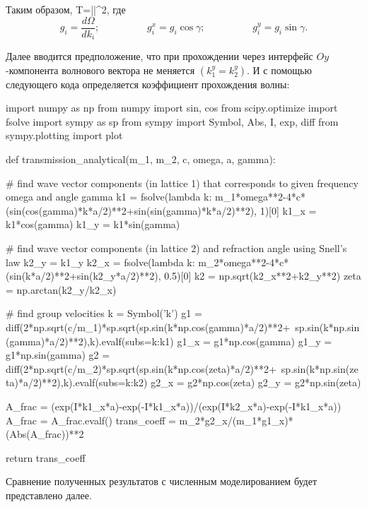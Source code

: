 \documentclass[main.tex]{subfiles}
\begin{document}
Таким образом,
\beq
T=\left|\right|^2,
\eeq
где
$$
g_i=\frac{d\Omega}{dk_i};\hspace{2cm}g_i^x=g_i\cos{\gamma};\hspace{2cm}g_i^y=g_i\sin{\gamma}.
$$

Далее вводится предположение, что при прохождении через интерфейс $Oy$-компонента волнового вектора не меняется $\left(k_1^y=k_2^y\right)$.
И с помощью следующего кода определяется коэффициент прохождения волны:

\begin{pythoncode}
import numpy as np
from numpy import sin, cos
from scipy.optimize import fsolve
import sympy as sp
from sympy import Symbol, Abs, I, exp, diff
from sympy.plotting import plot


def transmission_analytical(m_1, m_2, c, omega, a, gamma):

    # find wave vector components (in lattice 1) that corresponds to given frequency omega and angle gamma
    k1 = fsolve(lambda k: m_1*omega**2-4*c*(sin(cos(gamma)*k*a/2)**2+sin(sin(gamma)*k*a/2)**2), 1)[0]
    k1_x = k1*cos(gamma)
    k1_y = k1*sin(gamma)

    # find wave vector components (in lattice 2) and refraction angle using Snell's law
    k2_y = k1_y
    k2_x = fsolve(lambda k: m_2*omega**2-4*c*(sin(k*a/2)**2+sin(k2_y*a/2)**2), 0.5)[0]
    k2 = np.sqrt(k2_x**2+k2_y**2)
    zeta = np.arctan(k2_y/k2_x)

    # find group velocities
    k = Symbol('k')
    g1 = diff(2*np.sqrt(c/m_1)*sp.sqrt(sp.sin(k*np.cos(gamma)*a/2)**2+\
                                       sp.sin(k*np.sin(gamma)*a/2)**2),k).evalf(subs={k:k1})
    g1_x = g1*np.cos(gamma)
    g1_y = g1*np.sin(gamma)
    g2 = diff(2*np.sqrt(c/m_2)*sp.sqrt(sp.sin(k*np.cos(zeta)*a/2)**2+\
                                       sp.sin(k*np.sin(zeta)*a/2)**2),k).evalf(subs={k:k2})
    g2_x = g2*np.cos(zeta)
    g2_y = g2*np.sin(zeta)

    A_frac = (exp(I*k1_x*a)-exp(-I*k1_x*a))/(exp(I*k2_x*a)-exp(-I*k1_x*a))
    A_frac = A_frac.evalf()
    trans_coeff = m_2*g2_x/(m_1*g1_x)*(Abs(A_frac))**2
    
    return trans_coeff
\end{pythoncode}

Сравнение полученных результатов с численным моделированием будет представлено далее.
\end{document}
